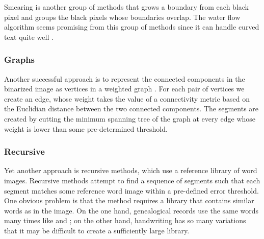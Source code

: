 Smearing is another group of methods that grows a boundary from each black pixel and groups the black pixels whose boundaries overlap. The water flow algorithm seems promising from this group of methods since it can handle curved text quite well \cite{Waterflow2011, Waterflow2015}.

\subsubsection{Graphs}

Another successful approach is to represent the connected components in the binarized image as vertices in a weighted graph \cite{GraphSegmentation}.
For each pair of vertices we create an edge, whose weight takes the value of a connectivity metric based on the Euclidian distance between the two connected components.
The segments are created by cutting the minimum spanning tree of the graph at every edge whose weight is lower than some pre-determined threshold.

\subsubsection{Recursive}

Yet another approach is recursive methods, which use a reference library of word images.
Recursive methods attempt to find a sequence of segments such that each segment matches some reference word image within a pre-defined error threshold.
One obvious problem is that the method requires a library that contains similar words as in the image. On the one hand, genealogical records use the same words many times like  and ; on the other hand, handwriting has so many variations that it may be difficult to create a sufficiently large library.



